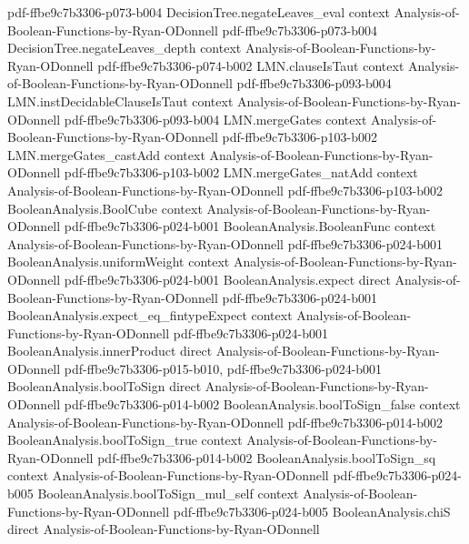 \begin{theorem}
  {pdf-ffbe9c7b3306-p073-b004}
\proofstep
  {DecisionTree.negateLeaves_eval}
  {context}
  {Analysis-of-Boolean-Functions-by-Ryan-ODonnell}
  {pdf-ffbe9c7b3306-p073-b004}
\proofstep
  {DecisionTree.negateLeaves_depth}
  {context}
  {Analysis-of-Boolean-Functions-by-Ryan-ODonnell}
  {pdf-ffbe9c7b3306-p074-b002}
\proofstep
  {LMN.clauseIsTaut}
  {context}
  {Analysis-of-Boolean-Functions-by-Ryan-ODonnell}
  {pdf-ffbe9c7b3306-p093-b004}
\proofstep
  {LMN.instDecidableClauseIsTaut}
  {context}
  {Analysis-of-Boolean-Functions-by-Ryan-ODonnell}
  {pdf-ffbe9c7b3306-p093-b004}
\proofstep
  {LMN.mergeGates}
  {context}
  {Analysis-of-Boolean-Functions-by-Ryan-ODonnell}
  {pdf-ffbe9c7b3306-p103-b002}
\proofstep
  {LMN.mergeGates_castAdd}
  {context}
  {Analysis-of-Boolean-Functions-by-Ryan-ODonnell}
  {pdf-ffbe9c7b3306-p103-b002}
\proofstep
  {LMN.mergeGates_natAdd}
  {context}
  {Analysis-of-Boolean-Functions-by-Ryan-ODonnell}
  {pdf-ffbe9c7b3306-p103-b002}
\proofstep
  {BooleanAnalysis.BoolCube}
  {context}
  {Analysis-of-Boolean-Functions-by-Ryan-ODonnell}
  {pdf-ffbe9c7b3306-p024-b001}
\proofstep
  {BooleanAnalysis.BooleanFunc}
  {context}
  {Analysis-of-Boolean-Functions-by-Ryan-ODonnell}
  {pdf-ffbe9c7b3306-p024-b001}
\proofstep
  {BooleanAnalysis.uniformWeight}
  {context}
  {Analysis-of-Boolean-Functions-by-Ryan-ODonnell}
  {pdf-ffbe9c7b3306-p024-b001}
\proofstep
  {BooleanAnalysis.expect}
  {direct}
  {Analysis-of-Boolean-Functions-by-Ryan-ODonnell}
  {pdf-ffbe9c7b3306-p024-b001}
\proofstep
  {BooleanAnalysis.expect_eq_fintypeExpect}
  {context}
  {Analysis-of-Boolean-Functions-by-Ryan-ODonnell}
  {pdf-ffbe9c7b3306-p024-b001}
\proofstep
  {BooleanAnalysis.innerProduct}
  {direct}
  {Analysis-of-Boolean-Functions-by-Ryan-ODonnell}
  {pdf-ffbe9c7b3306-p015-b010,
    pdf-ffbe9c7b3306-p024-b001}
\proofstep
  {BooleanAnalysis.boolToSign}
  {direct}
  {Analysis-of-Boolean-Functions-by-Ryan-ODonnell}
  {pdf-ffbe9c7b3306-p014-b002}
\proofstep
  {BooleanAnalysis.boolToSign_false}
  {context}
  {Analysis-of-Boolean-Functions-by-Ryan-ODonnell}
  {pdf-ffbe9c7b3306-p014-b002}
\proofstep
  {BooleanAnalysis.boolToSign_true}
  {context}
  {Analysis-of-Boolean-Functions-by-Ryan-ODonnell}
  {pdf-ffbe9c7b3306-p014-b002}
\proofstep
  {BooleanAnalysis.boolToSign_sq}
  {context}
  {Analysis-of-Boolean-Functions-by-Ryan-ODonnell}
  {pdf-ffbe9c7b3306-p024-b005}
\proofstep
  {BooleanAnalysis.boolToSign_mul_self}
  {context}
  {Analysis-of-Boolean-Functions-by-Ryan-ODonnell}
  {pdf-ffbe9c7b3306-p024-b005}
\proofstep
  {BooleanAnalysis.chiS}
  {direct}
  {Analysis-of-Boolean-Functions-by-Ryan-ODonnell}

\end{theorem}
